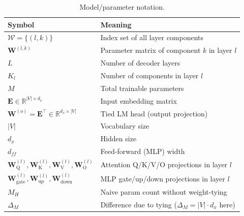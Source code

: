 \begin{table}[H]
    \centering
    \small
    \begin{tabular}{ll}
        \textbf{Symbol} & \textbf{Meaning} \\
        \hline
        $\mathcal{W}=\{(l,k)\}$ & Index set of all layer components \\
        $\mathbf{W}^{(l,k)}$ & Parameter matrix of component $k$ in layer $l$ \\
        $L$ & Number of decoder layers \\
        $K_l$ & Number of components in layer $l$ \\
        $M$ & Total trainable parameters \\
        $\mathbf{E}\in\mathbb{R}^{|V|\times d_x}$ & Input embedding matrix \\
        $\mathbf{W}^{(o)}=\mathbf{E}^{\top}\in\mathbb{R}^{d_x\times|V|}$ & Tied LM head (output projection) \\
        $|V|$ & Vocabulary size \\
        $d_x$ & Hidden size \\
        $d_{ff}$ & Feed-forward (MLP) width \\
        $\mathbf{W}^{(l)}_{\mathrm{Q}},\mathbf{W}^{(l)}_{\mathrm{K}},\mathbf{W}^{(l)}_{\mathrm{V}},\mathbf{W}^{(l)}_{\mathrm{O}}$ & Attention Q/K/V/O projections in layer $l$ \\
        $\mathbf{W}^{(l)}_{\text{gate}},\mathbf{W}^{(l)}_{\text{up}},\mathbf{W}^{(l)}_{\text{down}}$ & MLP gate/up/down projections in layer $l$ \\
        $M_H$ & Naive param count without weight-tying \\
        $\Delta_M$ & Difference due to tying ($\Delta_M=|V|\cdot d_x$ here) \\
    \end{tabular}
    \caption{Model/parameter notation.}
    \label{tab:nomenclature-params}
\end{table}

